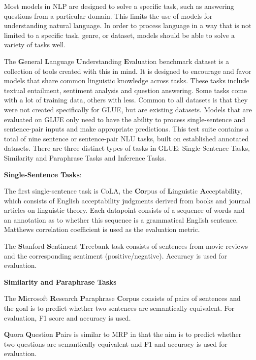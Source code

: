\documentclass[]{krantz}
\begin{document}
Most models in NLP are designed to solve a specific task, such as answering questions from a particular domain. This limits the use of models for understanding natural language. In order to process language in a way that is not limited to a specific task, genre, or dataset, models should be able to solve a variety of tasks well.

The \textbf{G}eneral \textbf{L}anguage \textbf{U}nderstanding \textbf{E}valuation benchmark dataset is a collection of tools created with this in mind. It is designed to encourage and favor models that share common linguistic knowledge across tasks. These tasks include textual entailment, sentiment analysis and question answering. Some tasks come with a lot of training data, others with less. Common to all datasets is that they were not created specifically for GLUE, but are existing datasets. Models that are evaluated on GLUE only need to have the ability to process single-sentence and sentence-pair inputs and make appropriate predictions.
This test suite contains a total of nine sentence or sentence-pair NLU tasks, built on established annotated datasets. There are three distinct types of tasks in GLUE: Single-Sentence Tasks, Similarity and Paraphrase Tasks and Inference Tasks.

\textbf{Single-Sentence Tasks}:

The first single-sentence task is CoLA, the \textbf{Co}rpus of \textbf{L}inguistic \textbf{A}cceptability, which consists of English acceptability judgments derived from books and journal articles on linguistic theory. Each datapoint consists of a sequence of words and an annotation as to whether this sequence is a grammatical English sentence. Matthews correlation coefficient is used as the evaluation metric.

The \textbf{S}tanford \textbf{S}entiment \textbf{T}reebank task consists of sentences from movie reviews and the corresponding sentiment (positive/negative). Accuracy is used for evaluation.

\textbf{Similarity and Paraphrase Tasks}

The \textbf{M}icrosoft \textbf{R}esearch \textbf{P}araphrase \textbf{C}orpus consists of pairs of sentences and the goal is to predict whether two sentences are semantically equivalent. For evaluation, F1 score and accuracy is used.

\textbf{Q}uora \textbf{Q}uestion \textbf{P}airs is similar to MRP in that the aim is to predict whether two questions are semantically equivalent and F1 and accuracy is used for evaluation.
\end{document}
